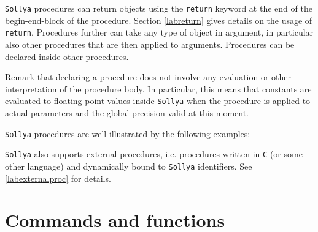 \documentclass[a4paper]{article}
\newcommand{\key}[1]{\texttt{#1}}
\newcommand{\sollya}{\texttt{Sollya}\xspace}
\begin{document}
\sollya procedures can return objects using the \key{return} keyword
at the end of the begin-end-block of the procedure. Section
\ref{labreturn} gives details on the usage of \key{return}. Procedures
further can take any type of object in argument, in particular also
other procedures that are then applied to arguments. Procedures can
be declared inside other procedures. 

Remark that declaring a procedure does not involve any evaluation or
other interpretation of the procedure body. In particular, this means
that constants are evaluated to floating-point values inside \sollya
when the procedure is applied to actual parameters and the global
precision valid at this moment.

\sollya procedures are well illustrated by the following examples:



\sollya also supports external procedures, i.e. procedures written in
\texttt{C} (or some other language) and dynamically bound to \sollya
identifiers. See \ref{labexternalproc} for details.

\section{Commands and functions}


\end{document}
